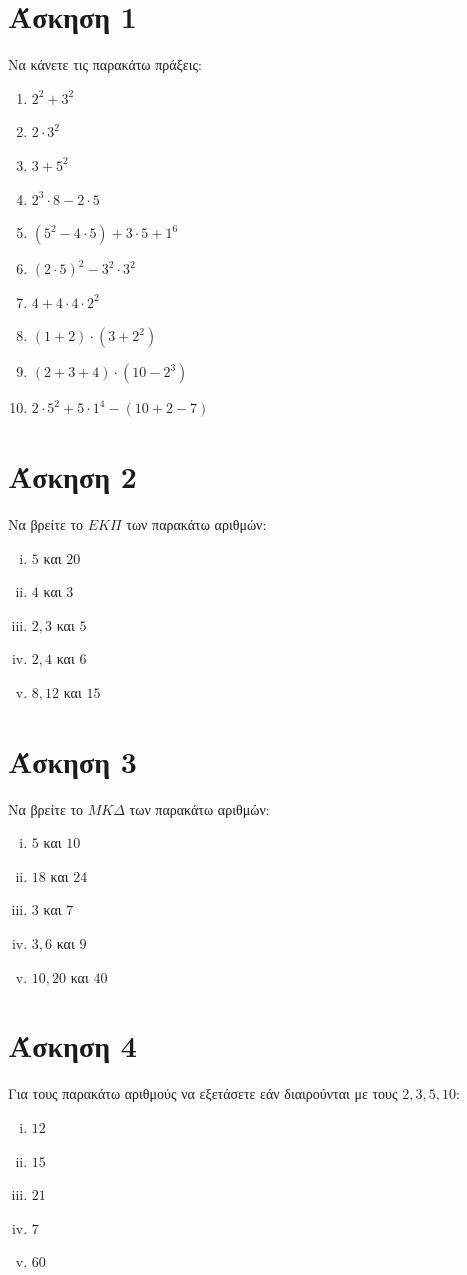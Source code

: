 \documentclass[a4paper,10pt]{report}
\begin{document}
\section*{Άσκηση 1  \hfill \small{}}
Να κάνετε τις παρακάτω πράξεις:
\begin{enumerate}[1)]
 \item $2^{2}+3^{2}$
 \item $2\cdot 3^{2}$
 \item $3+5^{2}$
 \item $2^{3}\cdot 8 -2\cdot 5$
 \item $(5^{2}-4\cdot 5)+3\cdot5+1^{6}$
 \item $(2\cdot 5)^{2}-3^{2}\cdot 3^{2}$
 \item $4+4\cdot 4\cdot2^{2}$
 \item $(1+2)\cdot (3+2^{2})$
 \item $(2+3+4)\cdot (10-2^{3})$
 \item $2\cdot 5^{2}+5\cdot 1^{4}-(10+2-7)$
\end{enumerate}

\section*{Άσκηση 2  \hfill \small{}}
Να βρείτε το $ΕΚΠ$ των παρακάτω αριθμών:
\begin{enumerate}[i)]
 \item $5$ και $20$
 \item $4$ και $3$
 \item $2,3$ και $5$
 \item $2,4$ και $6$
 \item $8,12$ και $15$
\end{enumerate}

\section*{Άσκηση 3  \hfill \small{}}
Να βρείτε το $ΜΚΔ$ των παρακάτω αριθμών:
\begin{enumerate}[i)]
 \item $5$ και $10$
 \item $18$ και $24$
 \item $3$ και $7$
 \item $3,6$ και $9$
 \item $10,20$ και $40$
\end{enumerate}

\section*{Άσκηση 4  \hfill \small{}}
Για τους παρακάτω αριθμούς να εξετάσετε εάν διαιρούνται με τους $2,3,5,10$:
\begin{enumerate}[i)]
 \item $12$
 \item $15$
 \item $21$
 \item $7$
 \item $60$
\end{enumerate}
\end{document}

